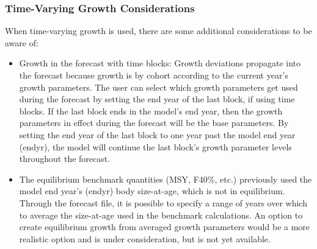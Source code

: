

\hypertarget{tvgrowth}{}
\subsubsection{Time-Varying Growth Considerations}
When time-varying growth is used, there are some additional considerations to be aware of:
\begin{itemize}
	\item Growth in the forecast with time blocks: Growth deviations propagate into the forecast because growth is by cohort according to the current year's growth parameters. The user can select which growth parameters get used during the forecast by setting the end year of the last block, if using time blocks. If the last block ends in the model's end year, then the growth parameters in effect during the forecast will be the base parameters.  By setting the end year of the last block to one year past the model end year (endyr), the model will continue the last block's growth parameter levels throughout the forecast.
	\item The equilibrium benchmark quantities (MSY, F40\%, etc.) previously used the model end year's (endyr) body size-at-age, which is not in equilibrium. Through the forecast file, it is possible to specify a range of years over which to average the size-at-age used in the benchmark calculations. An option to create equilibrium growth from averaged growth parameters would be a more realistic option and is under consideration, but is not yet available.
\end{itemize}

